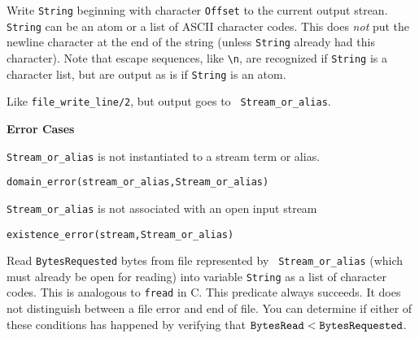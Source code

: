 \begin{description}

   Write {\tt String} beginning with character {\tt Offset} to the
   current output strean. {\tt String} can be an atom or a list of
   ASCII character codes. This does \emph{not} put the newline
   character at the end of the string (unless {\tt String} already had
   this character). Note that escape sequences, like \verb|\n|, are
   recognized if {\tt String} is a character list, but are output as
   is if {\tt String} is an atom.

Like \verb|file_write_line/2|, but output goes to {\tt
Stream\_or\_alias}.  

{\bf Error Cases}
\bi
\item 	{\tt Stream\_or\_alias} is not instantiated to a stream term
or alias.
\bi
\item 	{\tt domain\_error(stream\_or\_alias,Stream\_or\_alias)}
\ei
\item 	{\tt Stream\_or\_alias} is not associated with an open input stream
\bi
\item 	{\tt existence\_error(stream,Stream\_or\_alias)}
\ei
\ei




Read {\tt BytesRequested} bytes from file represented by {\tt
Stream\_or\_alias} (which must already be open for reading) into
variable {\tt String} as a list of character codes. This is analogous
to {\tt fread} in C.  This predicate always succeeds. It does not
distinguish between a file error and end of file.  You can determine
if either of these conditions has happened by verifying that $\tt
BytesRead < BytesRequested$.


\end{description}
